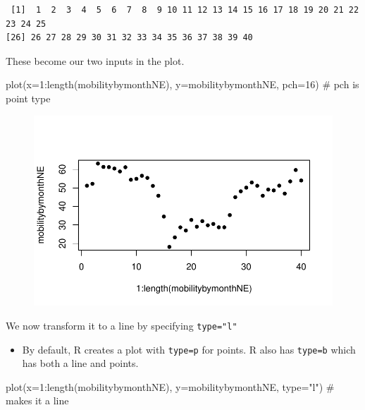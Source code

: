 \documentclass[
  letterpaper,
  DIV=11,
  numbers=noendperiod]{scrreprt}
\newenvironment{Shaded}{\begin{snugshade}}{\end{snugshade}}
\newcommand{\AttributeTok}[1]{\textcolor[rgb]{0.40,0.45,0.13}{#1}}
\newcommand{\CommentTok}[1]{\textcolor[rgb]{0.37,0.37,0.37}{#1}}
\newcommand{\DecValTok}[1]{\textcolor[rgb]{0.68,0.00,0.00}{#1}}
\newcommand{\FunctionTok}[1]{\textcolor[rgb]{0.28,0.35,0.67}{#1}}
\newcommand{\NormalTok}[1]{\textcolor[rgb]{0.00,0.23,0.31}{#1}}
\newcommand{\SpecialCharTok}[1]{\textcolor[rgb]{0.37,0.37,0.37}{#1}}
\newcommand{\StringTok}[1]{\textcolor[rgb]{0.13,0.47,0.30}{#1}}
\providecommand{\tightlist}{%
  \setlength{\itemsep}{0pt}\setlength{\parskip}{0pt}}\usepackage{longtable,booktabs,array}
\begin{document}
\begin{verbatim}
 [1]  1  2  3  4  5  6  7  8  9 10 11 12 13 14 15 16 17 18 19 20 21 22 23 24 25
[26] 26 27 28 29 30 31 32 33 34 35 36 37 38 39 40
\end{verbatim}

These become our two inputs in the plot.

\begin{Shaded}
\begin{Highlighting}[]
\FunctionTok{plot}\NormalTok{(}\AttributeTok{x=}\DecValTok{1}\SpecialCharTok{:}\FunctionTok{length}\NormalTok{(mobilitybymonthNE),}
     \AttributeTok{y=}\NormalTok{mobilitybymonthNE, }\AttributeTok{pch=}\DecValTok{16}\NormalTok{) }\CommentTok{\# pch is point type}
\end{Highlighting}
\end{Shaded}

\begin{figure}[H]

{\centering \includegraphics{04-Visualization_files/figure-pdf/unnamed-chunk-37-1.pdf}

}

\end{figure}

We now transform it to a line by specifying \texttt{type="l"}

\begin{itemize}
\tightlist
\item
  By default, R creates a plot with \texttt{type=p} for points. R also
  has \texttt{type=b} which has both a line and points.
\end{itemize}

\begin{Shaded}
\begin{Highlighting}[]
\FunctionTok{plot}\NormalTok{(}\AttributeTok{x=}\DecValTok{1}\SpecialCharTok{:}\FunctionTok{length}\NormalTok{(mobilitybymonthNE),}
     \AttributeTok{y=}\NormalTok{mobilitybymonthNE, }\AttributeTok{type=}\StringTok{"l"}\NormalTok{) }\CommentTok{\# makes it a line}
\end{Highlighting}
\end{Shaded}
\end{document}
